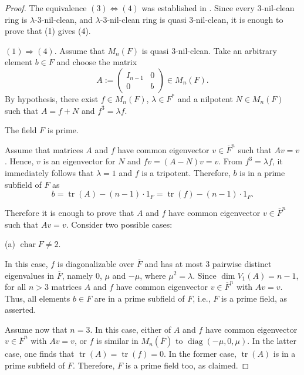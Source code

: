 \documentclass{amsart}
\DeclareMathOperator{\Char}{char}
\DeclareMathOperator{\diag}{diag}
\DeclareMathOperator{\tr}{tr}
\theoremstyle{definition}
\theoremstyle{remark}
\numberwithin{equation}{section}
\begin{document}
\begin{proof} The equivalence $(3) \Leftrightarrow (4)$ was established in \cite{A17}. Since every $3$-nil-clean ring is $\lambda$-$3$-nil-clean, and $\lambda$-$3$-nil-clean ring is quasi $3$-nil-clean, it is enough to prove that (1) gives (4).

$(1) \Rightarrow (4)$. Assume that $M_{n}(F)$ is quasi $3$-nil-clean. Take an arbitrary element $b \in F$ and choose the matrix
\[
  A :=
  \left(
  \begin{array}{c|c}
    I_{n-1} & 0
    \\
    \hline
    0 & b
  \end{array}
  \right) \in M_{n}(F).
\]
By hypothesis, there exist $f \in M_{n}(F)$, $\lambda \in F^{*}$ and a nilpotent $N \in M_{n}(F)$ such that
$A = f + N$ and $f^{3} = \lambda f$.

\medskip

 The field $F$ is prime.

\medskip

Assume that matrices $A$ and $f$ have common eigenvector $v \in \overline{F}^{n}$ such that $Av = v$. Hence, $v$ is an eigenvector for $N$ and $fv = (A-N)v = v$. From $f^{3} = \lambda f$, it immediately follows that $\lambda=1$ and $f$ is a tripotent. Therefore, $b$ is in a prime subfield of $F$ as $$b = \tr(A) - (n-1) \cdot 1_{F} =\tr(f) - (n-1) \cdot 1_{F}.$$

Therefore it is enough to prove that $A$ and $f$ have common eigenvector $v \in \overline{F}^{n}$ such that $Av = v$. Consider two possible cases:

\medskip

(a) $\Char F \not = 2$.

\medskip

In this case, $f$ is diagonalizable over $\overline{F}$ and has at most $3$ pairwise distinct eigenvalues in $\overline{F}$, namely $0$, $\mu$ and $-\mu$, where $\mu^{2}=\lambda$. Since $\dim V_{1}(A) = n-1$, for all $n>3$ matrices $A$ and $f$ have common eigenvector $v \in \overline{F}^{n}$ with $Av = v$. Thus, all elements $b \in F$ are in a prime subfield of $F$, i.e., $F$ is a prime field, as asserted.

\medskip

Assume now that $n=3$. In this case, either of $A$ and $f$ have common eigenvector $v \in \overline{F}^{n}$ with $Av = v$, or $f$ is similar in $M_{n}(\overline{F})$ to $\diag(-\mu, 0, \mu)$. In the latter case, one finds that $\tr (A) = \tr(f) = 0$. In the former case, $\tr (A)$ is in a prime subfield of $F$. Therefore, $F$ is a prime field too, as claimed.


\end{proof}
\end{document}
